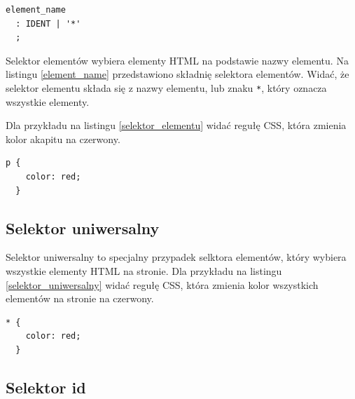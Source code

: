\documentclass[a4paper,12pt]{book} %
\begin{document}
\begin{lstfloat}[hb]
  \lstset{language=HTML}
  \begin{lstlisting}[frame=single]
element_name
  : IDENT | '*'
  ;
\end{lstlisting}
  \caption{Składnia selektora elementów CSS \cite{GrammarofCSS}}\label{element_name}
\end{lstfloat}
Selektor elementów wybiera elementy HTML na podstawie nazwy elementu. Na listingu \ref{element_name} przedstawiono składnię selektora elementów. Widać, że selektor elementu składa się z nazwy elementu, lub znaku \lstinline|*|, który oznacza wszystkie elementy.

Dla przykładu na listingu \ref{selektor_elementu} widać regułę CSS, która zmienia kolor akapitu na czerwony.



\begin{lstfloat}[hb]
  \lstset{language=HTML}
  \begin{lstlisting}[frame=single]
  p {
    color: red;
  }\end{lstlisting}

  \caption{Reguła z selektorem wszystkich akapitów na stronie}
  \label{selektor_elementu}

\end{lstfloat}


\subsection{Selektor uniwersalny}
Selektor uniwersalny to specjalny przypadek selktora elementów, który wybiera wszystkie elementy HTML na stronie.
Dla przykładu na listingu \ref{selektor_uniwersalny} widać regułę CSS, która zmienia kolor wszystkich elementów na stronie na czerwony.



\begin{lstfloat}[hb]
  \lstset{language=HTML}
  \begin{lstlisting}[frame=single]
  * {
    color: red;
  }\end{lstlisting}

  \caption{Reguła z selektorem wszystkich elementów na stronie}
  \label{selektor_uniwersalny}

\end{lstfloat}


\subsection{Selektor id}
\end{document}
